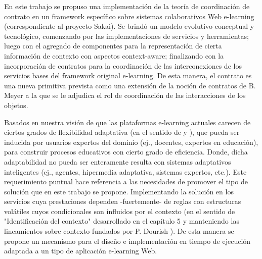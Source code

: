 En este trabajo se propuso una implementación de la teoría de coordinación de
contrato en un framework específico sobre sistemas colaborativos Web e-learning
(correspondiente al proyecto Sakai). Se brindó un modelo evolutivo conceptual y
tecnológico, comenzando por las implementaciones de servicios y herramientas;
luego con el agregado de componentes para la representación de cierta
información de contexto con aspectos context-aware; finalizando con la
incorporación de contratos para la coordinación de las interconexiones de los
servicios bases del framework original e-learning. De esta manera, el contrato
es una nueva primitiva prevista como una extensión de la noción de contratos de
B. Meyer \cite{meyer} a la que se le adjudica el rol de coordinación de las
interacciones de los objetos.

Basados en nuestra visión de que las plataformas e-learning actuales carecen de
ciertos grados de flexibilidad adaptativa (en el sentido de \cite{adaptativa} y
\cite{kcomponent}), que pueda ser inducida por usuarios expertos del dominio
(ej., docentes, expertos en educación), para construir procesos educativos con
cierto grado de eficiencia. Donde, dicha adaptabilidad no pueda ser enteramente
resulta con sistemas adaptativos inteligentes (ej., agentes, hipermedia
adaptativa, sistemas expertos, etc.). Este requerimiento puntual hace referencia
a las necesidades de promover el tipo de solución que en este trabajo se
propone. Implementando la solución en los servicios cuya prestaciones dependen
-fuertemente- de reglas con estructuras volátiles cuyos condicionales son
influidos por el contexto (en el sentido de "Identificación del contexto"
desarrollado en el capítulo 5 \cite{libro} y manteniendo las lineamientos sobre
contexto fundados por P. Dourish \cite{contexto}). De esta manera se propone un
mecanismo para el diseño e implementación en tiempo de ejecución adaptada a un
tipo de aplicación e-learning Web.
